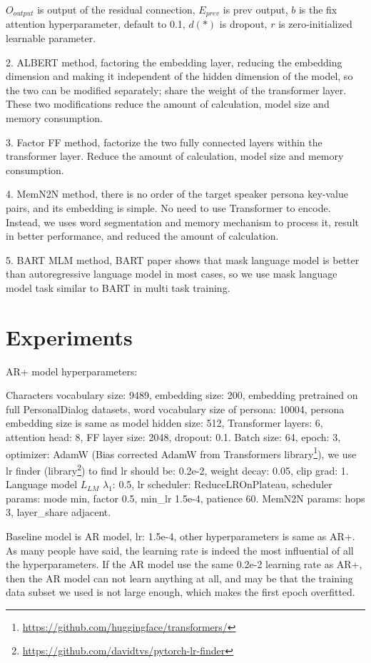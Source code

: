 \documentclass[letterpaper]{article} %
\DeclareRobustCommand{\citeext}[1]{\cite[#1]{#1}}
\begin{document}
$O_{output}$ is output of the residual connection, $E_{prev}$ is prev output, $b$ is the fix attention hyperparameter, default to 0.1, $d(*)$ is dropout, $r$ is zero-initialized learnable parameter.

2. ALBERT\citeext{Lan2019} method, factoring the embedding layer, reducing the embedding dimension and making it independent of the hidden dimension of the model, so the two can be modified separately; share the weight of the transformer layer. These two modifications reduce the amount of calculation, model size and memory consumption. 

3. Factor FF method, factorize the two fully connected layers within the transformer layer. Reduce the amount of calculation, model size and memory consumption. 

4. MemN2N\citeext{Sukhbaatar2015} method, there is no order of the target speaker persona key-value pairs, and its embedding is simple. No need to use Transformer to encode. Instead, we uses word segmentation and memory mechanism to process it, result in better performance, and reduced the amount of calculation. 

5. BART MLM\citeext{Lewis2019} method, BART paper shows that mask language model is better than autoregressive language model in most cases, so we use mask language model task similar to BART in multi task training. 

\section[Experiments]{Experiments} 
AR+ model hyperparameters:

Characters vocabulary size: 9489, embedding size: 200, embedding pretrained on full PersonalDialog\citeext{Zheng2019a} datasets, word vocabulary size of persona: 10004, persona embedding size is same as model hidden size: 512, 
Transformer layers: 6, attention head: 8, FF layer size: 2048, dropout: 0.1. 
Batch size: 64, epoch: 3, optimizer: AdamW (Bias corrected AdamW from Transformers library\footnote{\url{https://github.com/huggingface/transformers/}}), we use lr finder\citeext{Smith2015} (library\footnote{\url{https://github.com/davidtvs/pytorch-lr-finder}}) to find lr should be: 0.2e-2, weight decay: 0.05, clip grad: 1.
Language model $L_{LM}$ $\lambda_1$: 0.5, lr scheduler: ReduceLROnPlateau, scheduler params: mode min, factor 0.5, min\_lr 1.5e-4, patience 60.
MemN2N params: hops 3, layer\_share adjacent.

Baseline model is AR model, lr: 1.5e-4, other hyperparameters is same as AR+. As many people have said, the learning rate is indeed the most influential of all the hyperparameters. If the AR model use the same 0.2e-2 learning rate as AR+, then the AR model can not learn anything at all, and may be that the training data subset we used is not large enough, which makes the first epoch overfitted. 
\end{document}
